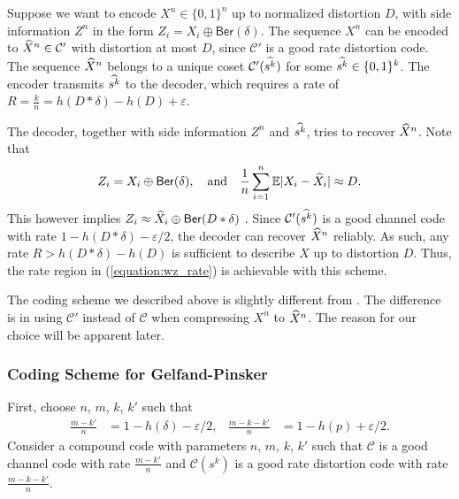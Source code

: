 Suppose we want to encode $X^n \in \{0,1\}^n$ up to normalized distortion $D$, with side information $Z^n$ in the form $Z_i = X_i \oplus \mathsf{Ber}(\delta)$.
The sequence $X^n$ can be encoded to $\widehat{X}^n \in \mathcal{C}'$ with distortion at most $D$, since $\mathcal{C}'$ is a good rate distortion code.
The sequence $\widehat{X}^n$ belongs to a unique coset $\mathcal{C}'(\widehat{s^k})$ for some $\widehat{s^k} \in \{0,1\}^k$.
The encoder transmits $\widehat{s^k}$ to the decoder, which requires a rate of $  R = \frac{k}{n} = h(D*\delta) - h(D) + \varepsilon$.

The decoder, together with side information $Z^n$ and $\widehat{s^k}$, tries to recover $\widehat{X}^n$.
Note that
\begin{align*}
  Z_i &= X_i \oplus \mathsf{Ber}(\delta), \quad \text{and}  & \frac{1}{n} \sum_{i=1}^n \mathbb{E} |X_i-\widehat{X}_i| \approx D .
\end{align*}
This however implies $Z_i \approx \widehat{X}_i \oplus \mathsf{Ber}(D * \delta)$ .
Since $\mathcal{C}'(\widehat{s^k})$ is a good channel code with rate $1 - h(D*\delta) - \varepsilon/2$, the decoder can recover $\widehat{X}^n$ reliably.
As such, any rate $R > h(D*\delta) - h(D)$ is sufficient to describe $X$ up to distortion $D$.
Thus, the rate region in (\ref{equation:wz_rate}) is achievable with this scheme.

\begin{remark}
  The coding scheme we described above is slightly different from \cite{Wainwright-it09}.
  The difference is in using $\mathcal{C}'$ instead of $\mathcal{C}$ when compressing $X^n$ to $\widehat{X}^n$.
  The reason for our choice will be apparent later.
\end{remark}

\subsubsection{Coding Scheme for Gelfand-Pinsker}
First, choose $n$, $m$, $k$, $k'$ such that
\begin{align*}
  \frac{m-k'}{n} &= 1 - h(\delta) - \varepsilon/2, & \frac{m-k-k'}{n} &= 1 - h(p) + \varepsilon/2 .
\end{align*}
Consider a compound code with parameters $n$, $m$, $k$, $k'$ such that $\mathcal{C}$ is a good channel code with rate $\tfrac{m-k'}{n}$ and $\mathcal{C}(s^k)$ is a good rate distortion code with rate $\tfrac{m-k-k'}{n}$.

